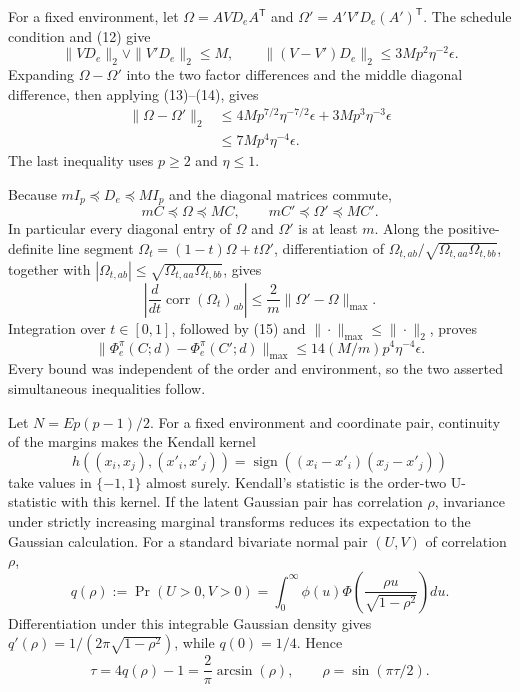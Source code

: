 For a fixed environment, let \(\Omega=AVD_eA^{\mathsf T}\) and
\(\Omega'=A'V'D_e(A')^{\mathsf T}\).  The schedule condition and (12) give
\[
 \|VD_e\|_2\vee\|V'D_e\|_2\le M,
 \qquad
 \|(V-V')D_e\|_2\le3Mp^2\eta^{-2}\epsilon.
\]
Expanding \(\Omega-\Omega'\) into the two factor differences and the middle diagonal difference, then applying (13)--(14), gives
\[
 \begin{aligned}
 \|\Omega-\Omega'\|_2
 &\le4Mp^{7/2}\eta^{-7/2}\epsilon
      +3Mp^3\eta^{-3}\epsilon\\
 &\le7Mp^4\eta^{-4}\epsilon. 
 \end{aligned} \tag{15}
\]
The last inequality uses \(p\ge2\) and \(\eta\le1\).

Because \(mI_p\preceq D_e\preceq MI_p\) and the diagonal matrices commute,
\[
 mC\preceq\Omega\preceq MC,
 \qquad mC'\preceq\Omega'\preceq MC'.
\]
In particular every diagonal entry of \(\Omega\) and \(\Omega'\) is at least \(m\).  Along the positive-definite line segment \(\Omega_t=(1-t)\Omega+t\Omega'\), differentiation of
\(\Omega_{t,ab}/\sqrt{\Omega_{t,aa}\Omega_{t,bb}}\), together with
\(|\Omega_{t,ab}|\le\sqrt{\Omega_{t,aa}\Omega_{t,bb}}\), gives
\[
 \left|\frac{d}{dt}\operatorname{corr}(\Omega_t)_{ab}\right|
 \le \frac{2}{m}\|\Omega'-\Omega\|_{\max}.
\]
Integration over \(t\in[0,1]\), followed by (15) and
\(\|\cdot\|_{\max}\le\|\cdot\|_2\), proves
\[
 \|\Phi_e^\pi(C;d)-\Phi_e^\pi(C';d)\|_{\max}
 \le14(M/m)p^4\eta^{-4}\epsilon.
\]
Every bound was independent of the order and environment, so the two asserted simultaneous inequalities follow.

Let \(N=Ep(p-1)/2\).  For a fixed environment and coordinate pair, continuity of the margins makes the Kendall kernel
\[
 h((x_i,x_j),(x'_i,x'_j))
 =\operatorname{sign}((x_i-x'_i)(x_j-x'_j))
\]
take values in \(\{-1,1\}\) almost surely.  Kendall's statistic is the order-two U-statistic with this kernel.  If the latent Gaussian pair has correlation \(\rho\), invariance under strictly increasing marginal transforms reduces its expectation to the Gaussian calculation.  For a standard bivariate normal pair \((U,V)\) of correlation \(\rho\),
\[
 q(\rho):=\Pr(U>0,V>0)
 =\int_0^\infty\phi(u)\Phi\!\left(\frac{\rho u}{\sqrt{1-\rho^2}}\right)du.
\]
Differentiation under this integrable Gaussian density gives
\(q'(\rho)=1/(2\pi\sqrt{1-\rho^2})\), while \(q(0)=1/4\).  Hence
\[
 \tau=4q(\rho)-1=\frac{2}{\pi}\arcsin(\rho),
 \qquad \rho=\sin(\pi\tau/2). \tag{16}
\]

